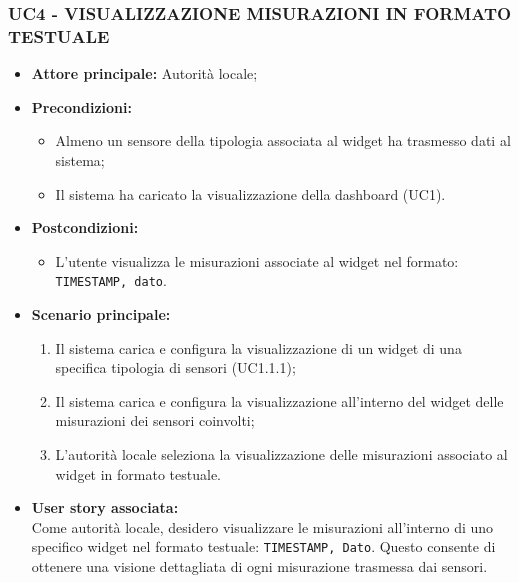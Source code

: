\subsubsection{UC4 - VISUALIZZAZIONE MISURAZIONI IN FORMATO TESTUALE}
\begin{itemize}
      \item \textbf{Attore principale:} Autorità locale;
      \item \textbf{Precondizioni:}
            \begin{itemize}
                  \item Almeno un sensore della tipologia associata al widget ha trasmesso dati al sistema;
                  \item Il sistema ha caricato la visualizzazione della dashboard (UC1). 
            \end{itemize}
      \item \textbf{Postcondizioni:}
            \begin{itemize}
                  \item L'utente visualizza le misurazioni associate al widget nel formato: \texttt{TIMESTAMP, dato}.
            \end{itemize}
      \item \textbf{Scenario principale:}
            \begin{enumerate}
                  \item Il sistema carica e configura la visualizzazione di un widget di una specifica tipologia di sensori (UC1.1.1);
                  \item Il sistema carica e configura la visualizzazione all'interno del widget delle misurazioni dei sensori coinvolti;
                  \item L'autorità locale seleziona la visualizzazione delle misurazioni associato al widget in formato testuale.
            \end{enumerate}
      \item \textbf{User story associata:} \\
            Come autorità locale, desidero visualizzare le misurazioni all'interno di uno specifico widget nel formato testuale: \texttt{TIMESTAMP, Dato}. Questo consente di ottenere una visione dettagliata di ogni misurazione trasmessa dai sensori.
\end{itemize}
